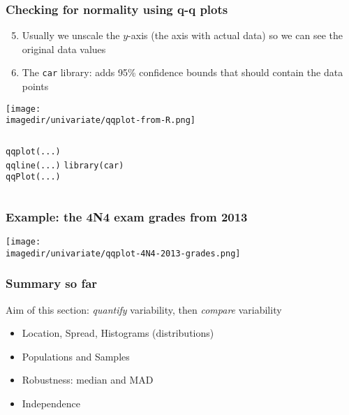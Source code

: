 \begin{frame}\frametitle{Checking for normality using q-q plots}
	\begin{enumerate}
		\setcounter{enumii}{4}
		\item	Usually we unscale the $y$-axis (the axis with actual data) so we can see the original data values
		\item	The \texttt{car} library: adds 95\% confidence bounds that should contain the data points
	\end{enumerate}
	\vspace{-8pt}
	\begin{center}
		\texttt{[image: \\imagedir/univariate/qqplot-from-R.png]}

		\begin{columns}[t]
				\texttt{qqplot(...)}\\
				\texttt{qqline(...)}
				\texttt{library(car)}\\
				\texttt{qqPlot(...)}
		\end{columns}
	\end{center}

\end{frame}

\begin{frame}\frametitle{Example: the 4N4 exam grades from 2013}
	\begin{center}
		\texttt{[image: \\imagedir/univariate/qqplot-4N4-2013-grades.png]}
	\end{center}
\end{frame}

\begin{frame}\frametitle{Summary so far}

	Aim of this section: \emph{quantify} variability, then \emph{compare} variability
	\begin{itemize}
		\item	Location, Spread, Histograms (distributions)
		\item	Populations and Samples
		\item	Robustness: median and MAD
		\item	Independence
	\end{itemize}
\end{frame}

